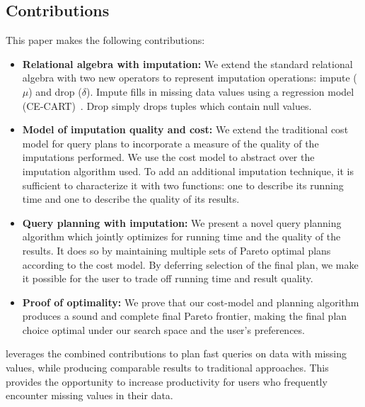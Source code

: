 \subsection{Contributions}
This paper makes the following contributions:
\begin{itemize}
\item \textbf{Relational algebra with imputation:}
  We extend the standard relational algebra with two new operators to represent imputation operations: impute ($\mu$) and drop ($\delta$).
  Impute fills in missing data values using a regression model (CE-CART)~\cite{burgette2010multiple}.
  Drop simply drops tuples which contain null values.
\item \textbf{Model of imputation quality and cost:}
  We extend the traditional cost model for query plans to incorporate a measure of the quality of the imputations performed.
  We use the cost model to abstract over the imputation algorithm used.
  To add an additional imputation technique, it is sufficient to characterize it with two functions: one to describe its running time and one to describe the quality of its results.
\item \textbf{Query planning with imputation:}
  We present a novel query planning algorithm which jointly optimizes for running time and the quality of the results.
  It does so by maintaining multiple sets of Pareto optimal plans according to the cost model.
  By deferring selection of the final plan, we make it possible for the user to trade off running time and result quality.
\item \textbf{Proof of optimality:}
 We prove that our cost-model and planning algorithm produces a sound and complete final Pareto frontier, making the final plan choice optimal under our search space and the user's preferences.
\end{itemize}

\ProjectName{} leverages the combined contributions to plan fast queries on data with missing values, while producing comparable results to traditional approaches.
This provides the opportunity to increase productivity for users who frequently encounter missing values in their data.



